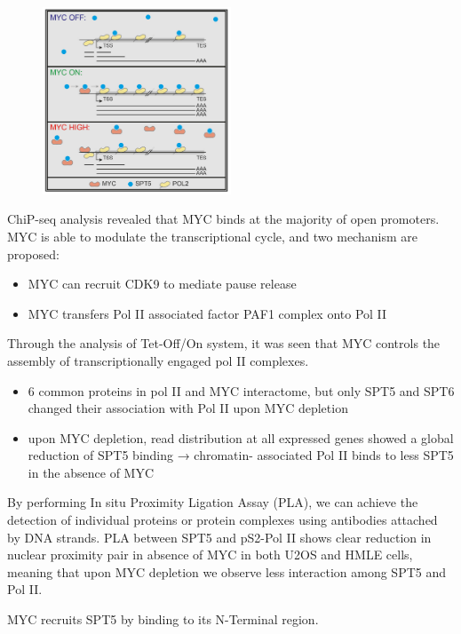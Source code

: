 \begin{figure}
\centering
\includegraphics[width=0.5\textwidth]{../_resources/Screenshot_2022-10-28_at_10-37-23.png}
\caption{}
\end{figure}

ChiP-seq analysis revealed that MYC binds at the majority of open promoters. MYC is able to modulate the transcriptional cycle, and two mechanism are
proposed:

\begin{itemize}
\tightlist
\item
  MYC can recruit CDK9 to mediate pause release
\item
  MYC transfers Pol II associated factor PAF1 complex onto Pol II
\end{itemize}

Through the analysis of Tet-Off/On system, it was seen that MYC controls the assembly of transcriptionally engaged pol II complexes.
\begin{itemize}
\tightlist
\item
  6 common proteins in pol II and MYC interactome, but only SPT5 and SPT6 changed their association with Pol II upon MYC depletion
\item
  upon MYC depletion, read distribution at all expressed genes showed a
  global reduction of SPT5 binding → chromatin- associated Pol II binds
  to less SPT5 in the absence of MYC
\end{itemize}

By performing In situ Proximity Ligation Assay (PLA), we can achieve the detection of individual proteins or protein complexes using antibodies attached by DNA strands. PLA between SPT5 and pS2-Pol II shows clear reduction in nuclear proximity pair in absence of MYC in both U2OS and HMLE cells, meaning that upon MYC depletion we observe less interaction among SPT5 and Pol II. 

MYC recruits SPT5 by binding to its N-Terminal region.

